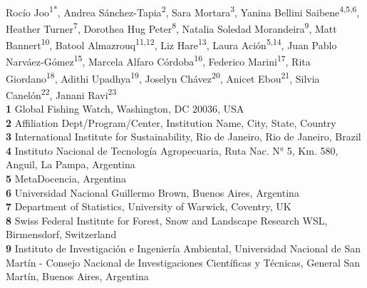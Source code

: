 \documentclass[10pt,letterpaper]{article}
\begin{document}
\vspace*{0.2in}

\begin{flushleft}
{\Large
\textbf{} %
}
\newline
\\
Rocío Joo\textsuperscript{1*\Yinyang}, 
Andrea Sánchez-Tapia\textsuperscript{2\Yinyang},
Sara Mortara\textsuperscript{3},
Yanina Bellini Saibene\textsuperscript{4,5,6},
Heather Turner\textsuperscript{7}, %
Dorothea Hug Peter\textsuperscript{8}, %
Natalia Soledad Morandeira\textsuperscript{9},
Matt Bannert\textsuperscript{10},
Batool Almazrouq\textsuperscript{11,12},
Liz Hare\textsuperscript{13},
Laura Ación\textsuperscript{5,14},
Juan Pablo Narváez-Gómez\textsuperscript{15},
Marcela Alfaro Córdoba\textsuperscript{16},
Federico Marini\textsuperscript{17},
Rita Giordano\textsuperscript{18},
Adithi Upadhya\textsuperscript{19},
Joselyn Chávez\textsuperscript{20},
Anicet Ebou\textsuperscript{21},
Silvia Canelón\textsuperscript{22},
Janani Ravi\textsuperscript{23}
\\
\bigskip
\textbf{1} Global Fishing Watch, Washington, DC 20036, USA
\\
\textbf{2} Affiliation Dept/Program/Center, Institution Name, City, State, Country
\\
\textbf{3} International Institute for Sustainability, Rio de Janeiro, Rio de Janeiro, Brazil
\\
\textbf{4} Instituto Nacional de Tecnología Agropecuaria, Ruta Nac. N° 5, Km. 580, Anguil, La Pampa, Argentina
\\
\textbf{5} MetaDocencia, Argentina
\\
\textbf{6} Universidad Nacional Guillermo Brown, Buenos Aires, Argentina
\\
\textbf{7} Department of Statistics, University of Warwick, Coventry, UK
\\
\textbf{8} Swiss Federal Institute for Forest, Snow and Landscape Research WSL, Birmensdorf, Switzerland
\\
\textbf{9} Instituto de Investigación e Ingeniería Ambiental, Universidad Nacional de San Martín - Consejo Nacional de Investigaciones Científicas y Técnicas, General San Martín, Buenos Aires, Argentina

\end{flushleft}
\end{document}
